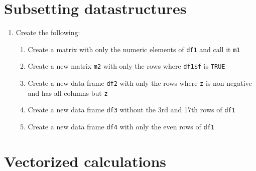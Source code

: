\documentclass{article}
\begin{document}
\section*{Subsetting datastructures}

\begin{enumerate}

\item Create the following:
    \begin{enumerate}
    \item Create a matrix with only the numeric elements of \texttt{df1}
          and call it \texttt{m1}
    \item Create a new matrix \texttt{m2} with only the rows where
          \texttt{df1\$f} is \texttt{TRUE}
    \item Create a new data frame \texttt{df2} with only the rows where
          \texttt{z} is non-negative and has all columns but \texttt{z}
    \item Create a new data frame \texttt{df3} without the 3rd and 17th
          rows of \texttt{df1}
    \item Create a new data frame \texttt{df4} with only the even rows
          of \texttt{df1}
    \end{enumerate}


\end{enumerate}

\section*{Vectorized calculations}
\end{document}
